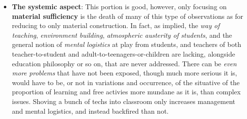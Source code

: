 \documentclass[10pt,a4paper]{article}
\begin{document}
\begin{itemize}
    \item \textbf{The systemic aspect}: This portion is good, however, only focusing on \textbf{material sufficiency} is the death of many of this type of observations as for reducing to only material construction. In fact, as implied, the \textit{way of teaching}, \textit{environment building}, \textit{atmospheric austerity of students}, and the general notion of \textit{mental logistics} at play from students, and teachers of both teacher-to-student and adult-to-teenagers-or-children are lacking, alongside education philosophy or so on, that are never addressed. There can be \textit{even more problems} that have not been exposed, though much more serious it is, would have to be, or not in variations and occurrence, of the situative of the proportion of learning and free activies more mundane as it is, than complex issues. Shoving a bunch of techs into classroom only increases management and mental logistics, and instead backfired than not. 

\end{itemize}
\end{document}
